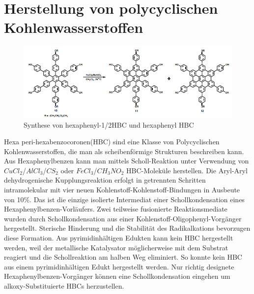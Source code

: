 \section{Herstellung von polycyclischen Kohlenwasserstoffen}
\begin{figure}[htpb!]
\centering
\includegraphics[scale=0.8]{graphics/Schollreactionhbc}
\caption{Synthese von hexaphenyl-1/2HBC und hexaphenyl HBC }
\end{figure}
Hexa peri-hexabenzocoronen(HBC) sind eine Klasse von Polycyclischen Kohlenwasserstoffen, die man als scheibenförmige Strukturen beschreiben kann.  Aus Hexaphenylbenzen kann man mittels Scholl-Reaktion unter Verwendung von $CuCl_2$/$AlCl_3$/$CS_2$ oder $FeCl_3$/$CH_3NO_2$ HBC-Moleküle herstellen. Die Aryl-Aryl dehydrogenische Kupplungsreaktion erfolgt in getrennten Schritten intramolekular mit vier neuen Kohlenstoff-Kohlenstoff-Bindungen in Ausbeute von 10\%. Das ist die einzige isolierte Intermediat einer Schollkondensation eines Hexaphenylbenzen-Vorläufers. Zwei teilweise fusionierte Reaktionsmediate wurden durch Schollkondensation aus einer Kohlenstoff-Oligophenyl-Vorgänger hergestellt. Sterische Hinderung und die Stabilität des Radikalkations bevorzugen diese Formation. Aus pyrimidinhältigen Edukten kann kein HBC hergestellt werden, weil der metallische Katalysator möglicherweise mit dem Substrat reagiert und die Schollreaktion am halben Weg eliminiert. So konnte kein HBC aus einem pyrimidinhältigen Edukt hergestellt werden. Nur richtig designete Hexaphenylbenzen-Vorgänger können eine Schollkondensation eingehen um alkoxy-Substituierte HBCs herzustellen. \cite{[15]}

